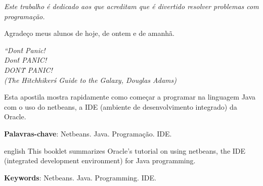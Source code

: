 \documentclass[
	12pt,				%
	openright,			%
	twoside,			%
	a4paper,			%
	english,			%
	french,				%
	spanish,			%
	brazil				%
	]{abntex2}
\begin{document}
\begin{dedicatoria}
   \vspace*{\fill}
   \centering
   \noindent
   \textit{ Este trabalho é dedicado aos que acreditam que é divertido resolver problemas com programação.} \vspace*{\fill}
\end{dedicatoria}

\begin{agradecimentos}

Agradeço meus alunos de hoje, de ontem e de amanhã.

\end{agradecimentos}

\begin{epigrafe}
    \vspace*{\fill}
	\begin{flushright}
		\textit{``Don\'t Panic!\\
		Don\'t PANIC! \\
		DON\'T PANIC! \\
		(The Hitchhiker\'s Guide to the Galaxy, Douglas Adams)}
	\end{flushright}
\end{epigrafe}


\setlength{\absparsep}{18pt} %
\begin{resumo}
Esta apostila mostra rapidamente como começar a programar na linguagem Java com o uso do netbeans, a IDE (ambiente de desenvolvimento integrado) da Oracle.

 \textbf{Palavras-chave}: Netbeans. Java. Programação. IDE.
\end{resumo}

\begin{resumo}[Abstract]
 \begin{otherlanguage*}{english}
   This booklet summarizes Oracle's tutorial on using netbeans, the IDE (integrated development environment) for Java programming.

   \vspace{\onelineskip}
 
   \noindent 
   \textbf{Keywords}: Netbeans. Java. Programming. IDE.
 \end{otherlanguage*}
\end{resumo}
\end{document}
